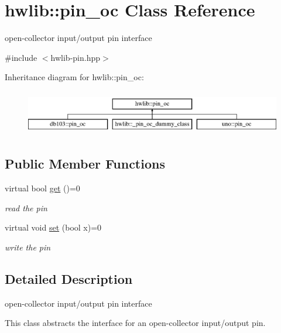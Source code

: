 \hypertarget{classhwlib_1_1pin__oc}{}\section{hwlib\+:\+:pin\+\_\+oc Class Reference}
\label{classhwlib_1_1pin__oc}


open-\/collector input/output pin interface  




{\ttfamily \#include $<$hwlib-\/pin.\+hpp$>$}

Inheritance diagram for hwlib\+:\+:pin\+\_\+oc\+:\begin{figure}[H]
\begin{center}
\leavevmode
\includegraphics[height=2.000000cm]{classhwlib_1_1pin__oc}
\end{center}
\end{figure}
\subsection*{Public Member Functions}
\begin{DoxyCompactItemize}
\item 
virtual bool \hyperlink{classhwlib_1_1pin__oc_aa395bf9608ca48ca07dee2f5dc4612bd}{get} ()=0
\begin{DoxyCompactList}\small\item\em read the pin \end{DoxyCompactList}\item 
virtual void \hyperlink{classhwlib_1_1pin__oc_a2165622dad253a423d2fa52cbed7c553}{set} (bool x)=0
\begin{DoxyCompactList}\small\item\em write the pin \end{DoxyCompactList}\end{DoxyCompactItemize}


\subsection{Detailed Description}
open-\/collector input/output pin interface 

This class abstracts the interface for an open-\/collector input/output pin. 

